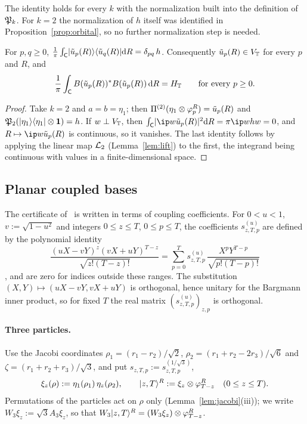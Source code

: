 The identity holds for every $k$ with the normalization built into the definition of $\mathfrak{P}_k$. For $k=2$ the normalization
of $h$ itself was identified in Proposition~\ref{prop:orbital}, so no further normalization step is needed.

\begin{corollary}\label{cor:pairmoyal}
For $p,q\ge0$, $\frac1\pi\int_{\mathsf{C}}\lvert \tilde u_p(R)\rangle\langle \tilde u_q(R)\rvert\mathrm{d} R=\delta_{pq}\,h$. Consequently $\tilde u_p(R)\in V_{\mathbb{T}}$ for every $p$ and $R$, and
\[
\frac1\pi\int_{\mathsf{C}} B(\tilde u_p(R))^*B(\tilde u_p(R))\,\mathrm{d} R=H_{\mathbb{T}}\qquad\text{for every }p\ge0 .
\]
\end{corollary}

\begin{proof}
Take $k=2$ and $a=b=\eta_1$; then $\Pi^{(2)}(\eta_1\otimes\varphi_p^R)=\tilde u_p(R)$ and $\mathfrak{P}_2(\lvert \eta_1\rangle\langle \eta_1\rvert\otimes\mathbf{1})=h$. If $w\perp V_{\mathbb{T}}$,
then $\int_\cell\abs{\ip w{\ut_p(R)}}^2\dd R=\pi\ip w{hw}=0$, and $R\mapsto\ip w{\ut_p(R)}$ is continuous, so it vanishes. The last
identity follows by applying the linear map $\mathcal{L}_2$ (Lemma~\ref{lem:lift}) to the first, the integrand being continuous with
values in a finite-dimensional space.
\end{proof}

\subsection{Planar coupled bases}

The certificate of~\cite{OAI:A-Fock-space-inequality-and-the-Laughlin-spectral-gap-September-24-2026} is written in terms of
coupling coefficients. For $0<u<1$, $v:=\sqrt{1-u^2}$ and integers $0\le z\le T$, $0\le p\le T$, the coefficients
$s^{(u)}_{z,T,p}$ are defined by the polynomial identity
\begin{equation}\label{eq:coupling}
\frac{(uX-vY)^z(vX+uY)^{T-z}}{\sqrt{z!(T-z)!}}=\sum_{p=0}^Ts^{(u)}_{z,T,p}\,\frac{X^pY^{T-p}}{\sqrt{p!(T-p)!}}
\end{equation}
\cite[Lemma~3.3 (Fixed-deficit coupling limit)]{OAI:A-Fock-space-inequality-and-the-Laughlin-spectral-gap-September-24-2026}, and are zero for indices outside these
ranges. The substitution $(X,Y)\mapsto(uX-vY,vX+uY)$ is orthogonal, hence unitary for the Bargmann inner product, so for
fixed $T$ the real matrix $(s^{(u)}_{z,T,p})_{z,p}$ is orthogonal.

\paragraph{Three particles.} Use the Jacobi coordinates $\rho_1=(r_1-r_2)/\sqrt2$, $\rho_2=(r_1+r_2-2r_3)/\sqrt6$ and
$\zeta=(r_1+r_2+r_3)/\sqrt3$, and put $s_{z,T,p}:=s^{(1/\sqrt3)}_{z,T,p}$,
\[
\xi_z(\rho):=\eta_1(\rho_1)\,\eta_z(\rho_2),\qquad \lvert z,T\rangle^R:=\xi_z\otimes\varphi^R_{T-z}\quad(0\le z\le T).
\]
Permutations of the particles act on $\rho$ only (Lemma~\ref{lem:jacobi}(iii)); we write $W_3\xi_z:=\sqrt3A_3\xi_z$, so that
$W_3\lvert z,T\rangle^R=(W_3\xi_z)\otimes\varphi^R_{T-z}$.

